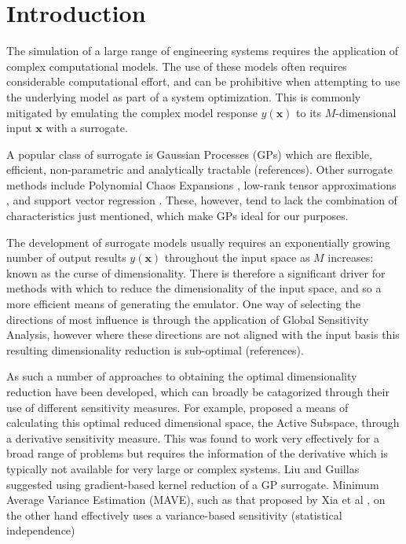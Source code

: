 \documentclass[preprint,12pt]{elsarticle}
\newcommand*{\M}[1]{\ensuremath{#1}\xspace}
\newcommand*{\vr}[1]{\M{\mathbf{#1}}}
\begin{document}

    \section{Introduction} \label{sec:Intro}
        The simulation of a large range of engineering systems requires the application of complex computational models. The use of these models often requires considerable computational effort, and can be prohibitive when attempting to use the underlying model as part of a system optimization. This is commonly mitigated by emulating the complex model response $y(\vr{x})$ to its \M{M}-dimensional input $\vr{x}$ with a surrogate. 
        
        A popular class of surrogate is Gaussian Processes (GPs) \cite{Sacks.etal1989, Rasmussen.Williams2005}which are flexible, efficient, non-parametric and analytically tractable (references). Other surrogate methods include Polynomial Chaos Expansions \cite{Ghanem.Spanos1997,Xiu.Karniadakis2002,Xiu2010}, low-rank tensor approximations \cite{Chevreuil.etal2015,Konakli.Sudret2016}, and support vector regression \cite{Cortes.Vapnik1995}.
        These, however, tend to lack the combination of characteristics just mentioned, which make GPs ideal for our purposes.
        
        The development of surrogate models usually requires an exponentially growing number of output results $y(\vr{x})$ throughout the input space as \M{M} increases: known as the curse of dimensionality. There is therefore a significant driver for methods with which to reduce the dimensionality of the input space, and so a more efficient means of generating the emulator. One way of selecting the directions of most influence is through the application of Global Sensitivity Analysis, however where these directions are not aligned with the input basis this resulting dimensionality reduction is sub-optimal (references).
        
        As such a number of approaches to obtaining the optimal dimensionality reduction have been developed, which can broadly be catagorized through their use of different sensitivity measures. For example, \cite{Constantine.etal2014} proposed a means of calculating this optimal reduced dimensional space, the Active Subspace, through a derivative sensitivity measure. This was found to work very effectively for a broad range of problems but requires the information of the derivative which is typically not available for very large or complex systems. Liu and Guillas \cite{Liu.Guillas2017} suggested using gradient-based kernel reduction of a GP surrogate.
        Minimum Average Variance Estimation (MAVE), such as that  proposed by Xia et al \cite{Xia.etal2002}, on the other hand effectively uses a variance-based sensitivity (statistical independence)
         
\end{document}
